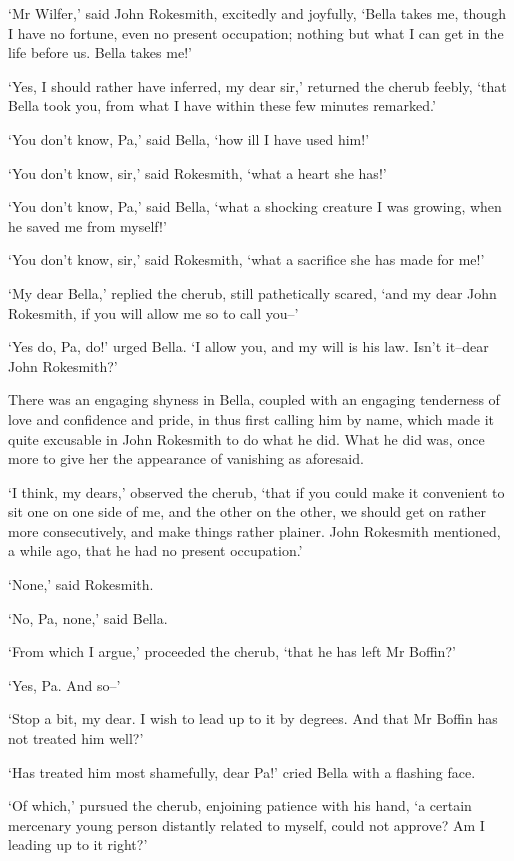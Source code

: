 ‘Mr Wilfer,’ said John Rokesmith, excitedly and joyfully, ‘Bella takes
me, though I have no fortune, even no present occupation; nothing but
what I can get in the life before us. Bella takes me!’

‘Yes, I should rather have inferred, my dear sir,’ returned the cherub
feebly, ‘that Bella took you, from what I have within these few minutes
remarked.’

‘You don’t know, Pa,’ said Bella, ‘how ill I have used him!’

‘You don’t know, sir,’ said Rokesmith, ‘what a heart she has!’

‘You don’t know, Pa,’ said Bella, ‘what a shocking creature I was
growing, when he saved me from myself!’

‘You don’t know, sir,’ said Rokesmith, ‘what a sacrifice she has made
for me!’

‘My dear Bella,’ replied the cherub, still pathetically scared, ‘and my
dear John Rokesmith, if you will allow me so to call you--’

‘Yes do, Pa, do!’ urged Bella. ‘I allow you, and my will is his law.
Isn’t it--dear John Rokesmith?’

There was an engaging shyness in Bella, coupled with an engaging
tenderness of love and confidence and pride, in thus first calling him
by name, which made it quite excusable in John Rokesmith to do what he
did. What he did was, once more to give her the appearance of vanishing
as aforesaid.

‘I think, my dears,’ observed the cherub, ‘that if you could make it
convenient to sit one on one side of me, and the other on the other, we
should get on rather more consecutively, and make things rather
plainer. John Rokesmith mentioned, a while ago, that he had no present
occupation.’

‘None,’ said Rokesmith.

‘No, Pa, none,’ said Bella.

‘From which I argue,’ proceeded the cherub, ‘that he has left Mr
Boffin?’

‘Yes, Pa. And so--’

‘Stop a bit, my dear. I wish to lead up to it by degrees. And that Mr
Boffin has not treated him well?’

‘Has treated him most shamefully, dear Pa!’ cried Bella with a flashing
face.

‘Of which,’ pursued the cherub, enjoining patience with his hand, ‘a
certain mercenary young person distantly related to myself, could not
approve? Am I leading up to it right?’

